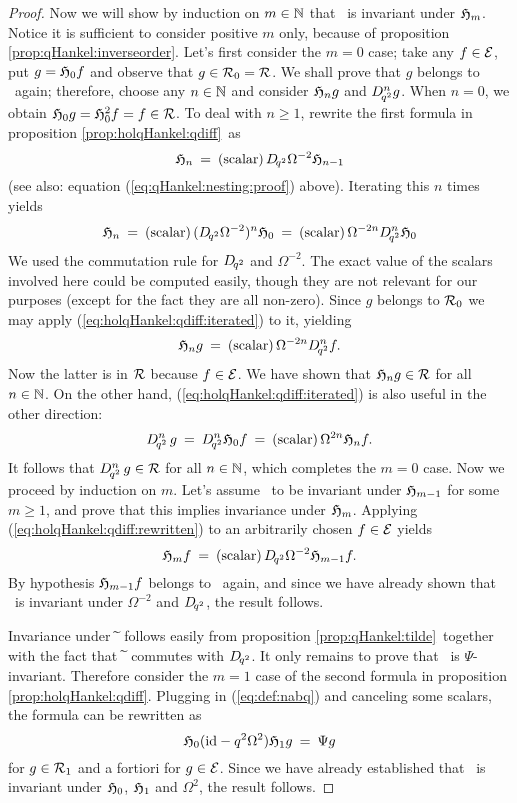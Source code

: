 \begin{proof}
Now we will show by induction on $m\in\mathbb{N}$ that \Hcore\ is invariant under
$\mathfrak{H}_{m}$. Notice it is sufficient to consider positive $m$ only,
because of proposition \ref{prop:qHankel:inverseorder}\@.
Let's first consider the $m=0$ case; take any $f\in\mathcal E$, put $g=\mathfrak{H}_{0}f$
and observe that $g\in{\mathcal R}_{0}=\mathcal R$.
We shall prove that $g$ belongs to \Hcore\ again;
therefore, choose any $n\in \mathbb{N}$ and consider $\mathfrak{H}_{n} g$ and $D_{\!q^2}^n g$.
When $n=0$, we obtain $\mathfrak{H}_{0} g = \mathfrak{H}_{0}^2 f = f \in \mathcal R$.
To deal with $n\geq 1$, rewrite the first formula in proposition
\ref{prop:holqHankel:qdiff}\ as
\begin{equation}\label{eq:holqHankel:qdiff:rewritten}
   \mathfrak{H}_{n}  \:=\: ({\rm scalar})\, D_{\!q^2} \Omega^{-2} \mathfrak{H}_{n-1}
\end{equation}
(see also: equation (\ref{eq:qHankel:nesting:proof}) above). Iterating this $n$ times yields
\begin{equation} \label{eq:holqHankel:qdiff:iterated}
   \mathfrak{H}_{n}  \:=\: ({\rm scalar})\, (D_{\!q^2} \Omega^{-2})^n \mathfrak{H}_{0}
             \:=\: ({\rm scalar})\, \Omega^{-2n} D_{\!q^2}^n \mathfrak{H}_{0}
\end{equation}
We used the commutation rule for $D_{\!q^2}$ and $\Omega^{-2}$.
The exact value of the scalars involved here could be computed easily, though
they are not relevant for our purposes (except for the fact they are all non-zero).
Since $g$ belongs to ${\mathcal R}_{0}$ we may apply (\ref{eq:holqHankel:qdiff:iterated})
to it, yielding
$$ \mathfrak{H}_{n} g     \:=\:    ({\rm scalar})\, \Omega^{-2n} D_{\!q^2}^n f. $$
Now the latter is in $\mathcal R$ because $f\in\mathcal E$.
We have shown that $\mathfrak{H}_{n} g \in \mathcal R$ for all $n\in \mathbb{N}$.
On the other hand, (\ref{eq:holqHankel:qdiff:iterated}) is also useful in
the other direction:
$$ D_{\!q^2}^n \,g
       \:=\:   D_{\!q^2}^n \mathfrak{H}_{0} f
       \:=\:   ({\rm scalar})\, \Omega^{2n} \mathfrak{H}_{n}f. $$
It follows that $D_{\!q^2}^n \, g \in \mathcal R$ for all $n\in \mathbb{N}$,
which completes the $m=0$ case. Now we proceed by induction on $m$.
Let's assume \Hcore\ to be invariant under $\mathfrak{H}_{m-1}$ for some $m\geq 1$,
and prove that this implies invariance under $\mathfrak{H}_{m}$.
Applying (\ref{eq:holqHankel:qdiff:rewritten}) to an arbitrarily chosen $f\in\mathcal E$ yields
$$  \mathfrak{H}_{m} f \:=\: ({\rm scalar})\, D_{\!q^2} \Omega^{-2} \mathfrak{H}_{m-1} f. $$
By hypothesis $\mathfrak{H}_{m-1} f$ belongs to \Hcore\ again, and since
we have already shown that \Hcore\ is invariant under $\Omega^{-2}$ and
$D_{\!q^2}$, the result follows.

Invariance under $\widetilde{\:}$ follows easily from proposition \ref{prop:qHankel:tilde}\
together with the fact that $\widetilde{\:}$ commutes with $D_{\!q^2}$.
It only remains to prove that \Hcore\ is $\Psi$-invariant.
Therefore consider the $m=1$ case of the second formula in
proposition \ref{prop:holqHankel:qdiff}\@. Plugging in (\ref{eq:def:nabq}) and
canceling some scalars, the formula can be rewritten as
$$ \mathfrak{H}_{0} (\mbox{\rm id} - q^2 \Omega^2) \mathfrak{H}_{1} g     \:=\:   \Psi g $$
for $g\in{\mathcal R}_{1}$ and a fortiori for $g\in\mathcal E$.
Since we have already established that \Hcore\ is invariant under
$\mathfrak{H}_{0}$, $\mathfrak{H}_{1}$ and $\Omega^2$, the result follows.
\end{proof}



